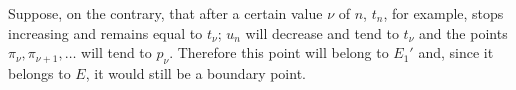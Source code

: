 \documentclass[10pt,letterpaper]{book}
\theoremstyle{definition}
\begin{document}
Suppose, on the contrary, that after a certain value $\nu$ of $n$, $t_n$, for example, stops increasing and remains equal to $t_\nu$; $u_n$ will decrease and tend to $t_\nu$ and the points $\pi_\nu,\pi_{\nu+1},\dots$ will tend to $p_\nu$. Therefore this point will belong to $E_1'$ and, since it belongs to $E$, it would still be a boundary point.

\begin{thebibliography}{9}

\end{thebibliography}
\end{document}
